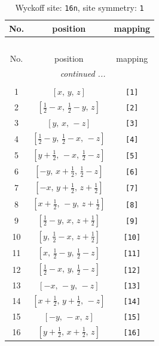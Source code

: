 \documentclass[fleqn,8pt]{jsarticle}
\begin{document}
\begin{longtable}{ccc}
\caption{Wyckoff site: {\tt 16n}, site symmetry: {\tt 1}}
 \\
 \hline \hline
No. & position & mapping \\ \hline \endfirsthead

\multicolumn{2}{l}{\tablename\ \thetable{}} \\
 \hline \hline
No. & position & mapping \\ \hline \endhead

 \hline \hline
\multicolumn{2}{r}{\footnotesize\it continued ...} \\ \endfoot

 \hline \hline
\multicolumn{2}{r}{} \\ \endlastfoot

1 & $\left[ x,\, y,\, z \right]$ & {\tt [1]} \\ \hline
2 & $\left[ \frac{1}{2} - x,\, \frac{1}{2} - y,\, z \right]$ & {\tt [2]} \\ \hline
3 & $\left[ y,\, x,\, - z \right]$ & {\tt [3]} \\ \hline
4 & $\left[ \frac{1}{2} - y,\, \frac{1}{2} - x,\, - z \right]$ & {\tt [4]} \\ \hline
5 & $\left[ y + \frac{1}{2},\, - x,\, \frac{1}{2} - z \right]$ & {\tt [5]} \\ \hline
6 & $\left[ - y,\, x + \frac{1}{2},\, \frac{1}{2} - z \right]$ & {\tt [6]} \\ \hline
7 & $\left[ - x,\, y + \frac{1}{2},\, z + \frac{1}{2} \right]$ & {\tt [7]} \\ \hline
8 & $\left[ x + \frac{1}{2},\, - y,\, z + \frac{1}{2} \right]$ & {\tt [8]} \\ \hline
9 & $\left[ \frac{1}{2} - y,\, x,\, z + \frac{1}{2} \right]$ & {\tt [9]} \\ \hline
10 & $\left[ y,\, \frac{1}{2} - x,\, z + \frac{1}{2} \right]$ & {\tt [10]} \\ \hline
11 & $\left[ x,\, \frac{1}{2} - y,\, \frac{1}{2} - z \right]$ & {\tt [11]} \\ \hline
12 & $\left[ \frac{1}{2} - x,\, y,\, \frac{1}{2} - z \right]$ & {\tt [12]} \\ \hline
13 & $\left[ - x,\, - y,\, - z \right]$ & {\tt [13]} \\ \hline
14 & $\left[ x + \frac{1}{2},\, y + \frac{1}{2},\, - z \right]$ & {\tt [14]} \\ \hline
15 & $\left[ - y,\, - x,\, z \right]$ & {\tt [15]} \\ \hline
16 & $\left[ y + \frac{1}{2},\, x + \frac{1}{2},\, z \right]$ & {\tt [16]} \\
\end{longtable}
\end{document}
